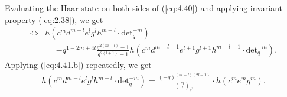 \documentclass[table,a4paper,reqno]{amsart}
\numberwithin{equation}{section}
\theoremstyle{definition}
\begin{document}
Evaluating the Haar state on both sides of (\ref{eq:4.40}) and applying invariant property (\ref{eq:2.38}), we get
\begin{equation}\label{eq:4.41.b}
    \begin{split}
        \Longleftrightarrow &h\left(c^md^{m-l}e^lg^{l}h^{m-l}\cdot\text{det}_q^{-m}\right)\\
        &=-q^{1-2m+4l}\frac{q^{2(m-l)}-1}{q^{2(l+1)}-1}h\left(c^md^{m-l-1}e^{l+1}g^{l+1}h^{m-l-1}\cdot\text{det}_q^{-m}\right).
    \end{split}
\end{equation}
Applying (\ref{eq:4.41.b}) repeatedly, we get
\begin{equation}\label{eq:4.42}
\begin{split}
    h\left(c^md^{m-l}e^lg^{l}h^{m-l}\cdot\text{det}_q^{-m}\right)=\frac{(-q)^{(m-l)(2l-1)}}{{m \choose l}_{q^2}}\cdot h\left(c^me^{m}g^{m}\right).
\end{split}
\end{equation}
\end{document}
